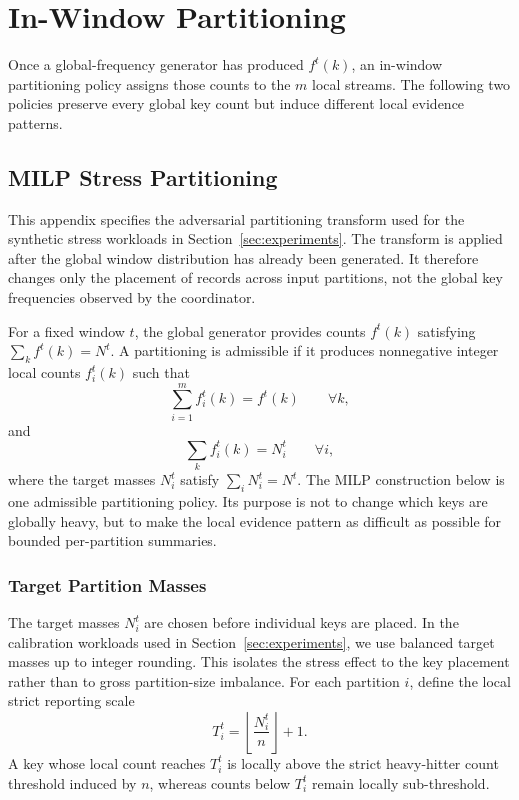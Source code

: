 \documentclass[sigconf, nonacm]{acmart}
\begin{document}
\section{In-Window Partitioning}
\label{app:in-window-partitioning}

Once a global-frequency generator has produced \(f^t(k)\), an in-window
partitioning policy assigns those counts to the \(m\) local streams. The
following two policies preserve every global key count but induce different
local evidence patterns.

\subsection{MILP Stress Partitioning}
\label{app:adversarial-partitioning}

This appendix specifies the adversarial partitioning transform used for the synthetic stress workloads in Section~\ref{sec:experiments}. The transform is applied after the global window distribution has already been generated. It therefore changes only the placement of records across input partitions, not the global key frequencies observed by the coordinator.

For a fixed window \(t\), the global generator provides counts \(f^t(k)\) satisfying \(\sum_k f^t(k)=N^t\). A partitioning is admissible if it produces nonnegative integer local counts \(f_i^t(k)\) such that
\[
\sum_{i=1}^m f_i^t(k)=f^t(k)
\qquad\forall k,
\]
and
\[
\sum_k f_i^t(k)=N_i^t
\qquad\forall i,
\]
where the target masses \(N_i^t\) satisfy \(\sum_i N_i^t=N^t\). The MILP construction below is one admissible partitioning policy. Its purpose is not to change which keys are globally heavy, but to make the local evidence pattern as difficult as possible for bounded per-partition summaries.

\subsubsection{Target Partition Masses}

The target masses \(N_i^t\) are chosen before individual keys are placed. In the calibration workloads used in Section~\ref{sec:experiments}, we use balanced target masses up to integer rounding. This isolates the stress effect to the key placement rather than to gross partition-size imbalance. For each partition \(i\), define the local strict reporting scale
\[
T_i^t=\left\lfloor \frac{N_i^t}{n}\right\rfloor + 1.
\]
A key whose local count reaches \(T_i^t\) is locally above the strict heavy-hitter count threshold induced by \(n\), whereas counts below \(T_i^t\) remain locally sub-threshold.
\end{document}
